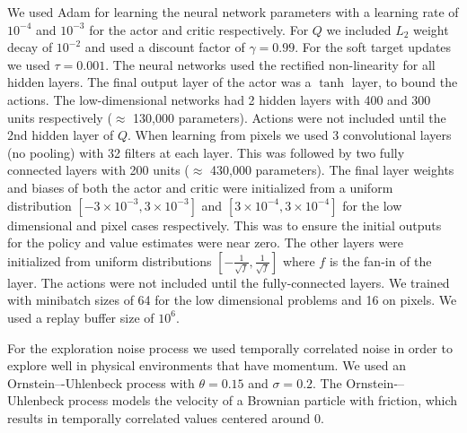 \documentclass{article} %
\begin{document}
We used Adam \citep{kingma2014adam} for learning the neural network
parameters with a learning rate of $10^{-4}$ and $10^{-3}$ for
the actor and critic respectively. For $Q$ we included $L_2$ weight
decay of $10^{-2}$ and used a discount factor of $\gamma = 0.99$. For
the soft target updates we used $\tau = 0.001$.  The neural networks
used the rectified non-linearity \citep{glorot2011deep} for all hidden
layers. The final output layer of the actor was a $\tanh$ layer, to bound
the actions. The low-dimensional networks had 2 hidden layers with 400 and
300 units respectively ($\approx$ 130,000 parameters).  Actions were
not included until the 2nd hidden layer of $Q$. When learning from
pixels we used 3 convolutional layers (no pooling) with 32 filters at
each layer. This was followed by two fully connected layers with 200
units ($\approx$ 430,000 parameters).
The final layer weights and biases
of both the actor and critic were initialized from a uniform
distribution $[-3 \times 10^{-3}, 3 \times 10^{-3}]$ and
$[3 \times 10^{-4}, 3 \times 10^{-4}]$ for the low dimensional and pixel
cases respectively. This was to ensure the initial outputs for the policy
and value estimates were near zero. The other layers were initialized from uniform
distributions $[-\frac{1}{\sqrt{f}}, \frac{1}{\sqrt{f}}]$ where $f$ is the fan-in
of the layer.
The actions were not included
until the fully-connected layers. We trained with minibatch sizes of 64
for the low dimensional problems and 16 on pixels. We used a replay buffer size
of $10^6$.

For the exploration noise process we used temporally correlated noise
in order to explore well in physical environments that have momentum.
We used an Ornstein–-Uhlenbeck process \citep{uhlenbeck1930theory}
with $\theta = 0.15$ and
$\sigma=0.2$. The Ornstein-–Uhlenbeck
process models the velocity of a Brownian particle with friction,
which results in temporally correlated values centered around 0.



\end{document}
